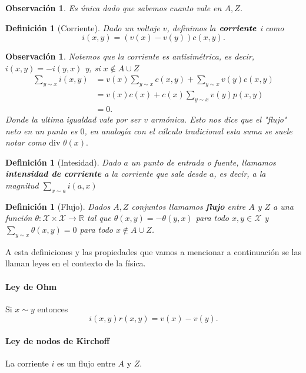 \documentclass[11pt,a4paper]{article}
\newcommand{\R}{\mathbb{R}}
\newcommand{\defn}[1]{\textbf{\emph{#1}}}
\numberwithin{equation}{section}
\theoremstyle{LPplain}
\theoremstyle{LPdef}
\newtheorem{defi}[teo]{Definición}
\theoremstyle{LPrem}
\newtheorem{obs}[teo]{Observación}
\begin{document}
\begin{obs}
  Es única dado que sabemos cuanto vale en $A, Z$.
\end{obs}

\begin{defi}[Corriente]
  Dado un voltaje $v$, definimos la $\defn{corriente}$ i
  como
  $$ i(x, y) = (v(x) - v(y))c(x, y).$$
\end{defi}

\begin{obs}
Notemos que la corriente es antisimétrica, es decir, $i(x, y) = -i(y, x)$
y, si $x \notin A\cup Z$
\begin{align*}
  \sum_{y \sim x} i(x, y) &= v(x) \sum_{y\sim x} c(x, y) + \sum_{y \sim x} v(y) c(x, y) \\
                          &= v(x) c(x) + c(x) \sum_{y \sim x} v(y) p(x, y) \\
                          &= 0. 
\end{align*}
Donde la ultima igualdad vale por ser $v$ armónica. Esto nos dice que el "flujo" neto 
en un punto es $0$, en analogía con el cálculo tradicional esta suma se suele notar 
como $\text{div }\theta(x).$
\end{obs}

\begin{defi}[Intesidad]
  Dado $a$ un punto de entrada o fuente, llamamos \defn{intensidad de corriente} 
  a la corriente que sale desde $a$, es decir,
  a la magnitud $\sum_{x \sim a} i(a, x)$  
\end{defi}

\begin{defi}[Flujo]
  Dados $A, Z$ conjuntos llamamos \defn{flujo} entre $A$ y $Z$ a una función $\theta : \mathcal{X} \times \mathcal{X} \to \R$ 
  tal que $\theta(x,y) = -\theta(y, x)$ para todo $x, y \in \mathcal{X}$ y 
  $\sum_{y \sim x} \theta(x , y) = 0$ para todo $x \notin A\cup Z$.
\end{defi}

A esta definiciones y las propiedades que vamos a mencionar a continuación se las 
llaman leyes en el contexto de la física.

\paragraph{Ley de Ohm} Si $x \sim y$ entonces 
$$i(x, y) r(x, y) = v(x) - v(y).$$

\paragraph{Ley de nodos de Kirchoff} La corriente $i$ es un flujo entre 
$A$ y $Z$.
\end{document}
